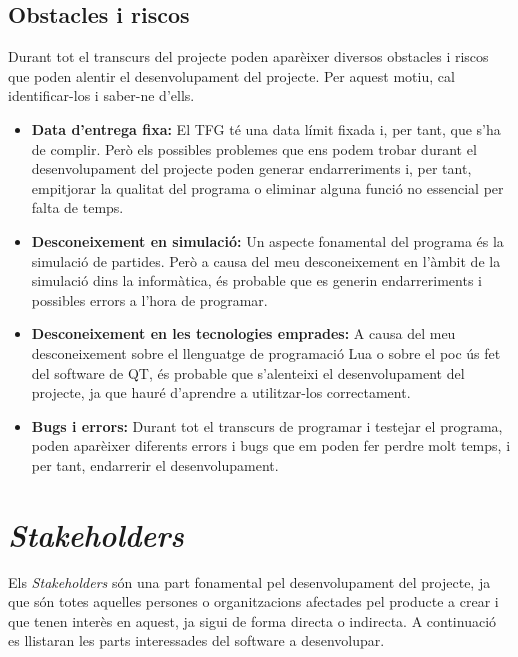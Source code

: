 \documentclass[a4paper]{article}
\begin{document}
\subsection{Obstacles i riscos}
Durant tot el transcurs del projecte poden aparèixer diversos obstacles i riscos que poden alentir el desenvolupament del projecte. Per aquest motiu, cal identificar-los i saber-ne d'ells.

\begin{itemize}
    \item \textbf{Data d'entrega fixa:} El TFG té una data límit fixada i, per tant, que s'ha de complir. Però els possibles problemes que ens podem trobar durant el desenvolupament del projecte poden generar endarreriments i, per tant, empitjorar la qualitat del programa o eliminar alguna funció no essencial per falta de temps.
    \item \textbf{Desconeixement en simulació:} Un aspecte fonamental del programa és la simulació de partides. Però a causa del meu desconeixement en l'àmbit de la simulació dins la informàtica, és probable que es generin endarreriments i possibles errors a l'hora de programar.
    \item \textbf{Desconeixement en les tecnologies emprades:} A causa del meu desconeixement sobre el llenguatge de programació Lua o sobre el poc ús fet del software de QT, és probable que s'alenteixi el desenvolupament del projecte, ja que hauré d'aprendre a utilitzar-los correctament.
    \item \textbf{Bugs i errors:} Durant tot el transcurs de programar i testejar el programa, poden aparèixer diferents errors i bugs que em poden fer perdre molt temps, i per tant, endarrerir el desenvolupament.
\end{itemize}


\newpage
\section{\textit{Stakeholders}}
Els \textit{Stakeholders} són una part fonamental pel desenvolupament del projecte, ja que són totes aquelles persones o organitzacions afectades pel producte a crear i que tenen interès en aquest, ja sigui de forma directa o indirecta. A continuació es llistaran les parts interessades del software a desenvolupar.
\end{document}
